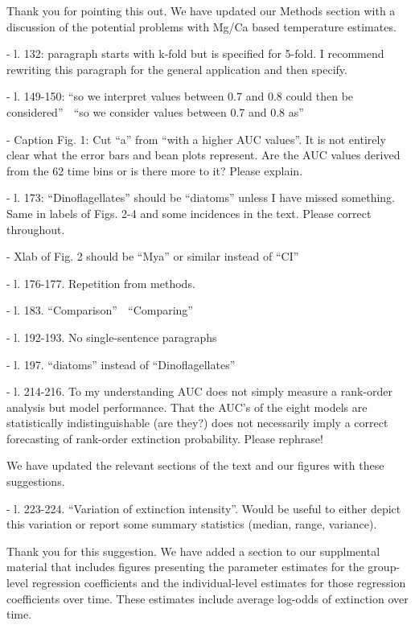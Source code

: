 \documentclass[12pt,letterpaper]{article}
\begin{document}
\begin{refsection}
Thank you for pointing this out. We have updated our Methods section with a discussion of the potential problems with Mg/Ca based temperature estimates. 

\begin{bfseries}
  - l. 132: paragraph starts with k-fold but is specified for 5-fold. I recommend rewriting this paragraph for the general application and then specify.

  - l. 149-150: “so we interpret values between 0.7 and 0.8 could then be considered”  “so we consider values between   0.7 and 0.8  as” 

  - Caption Fig. 1: Cut “a” from “with a higher AUC values”. It is not entirely clear what the error bars and bean plots represent. Are the AUC values derived from the 62 time bins or is there more to it? Please explain.

  - l. 173: “Dinoflagellates” should be “diatoms” unless I have missed something. Same in labels of Figs. 2-4 and some incidences in the text. Please correct throughout.

  - Xlab of Fig. 2 should be “Mya” or similar instead of “CI”

  - l. 176-177. Repetition from methods.

  - l. 183. “Comparison”  “Comparing”

  - l. 192-193. No single-sentence paragraphs

  - l. 197. “diatoms” instead of “Dinoflagellates”

  - l. 214-216. To my understanding AUC does not simply measure a rank-order analysis but model performance. That the AUC’s of the eight models are statistically indistinguishable (are they?) does not necessarily imply a correct forecasting of rank-order extinction probability.  Please rephrase!
\end{bfseries}

We have updated the relevant sections of the text and our figures with these suggestions.

\begin{bfseries}
  - l. 223-224. “Variation of extinction intensity”. Would be useful to either depict this variation or report some summary statistics (median, range, variance).
\end{bfseries}

Thank you for this suggestion. We have added a section to our supplmental material that includes figures presenting the parameter estimates for the group-level regression coefficients and the individual-level estimates for those regression coefficients over time. These estimates include average log-odds of extinction over time.


\end{refsection}
\end{document}
